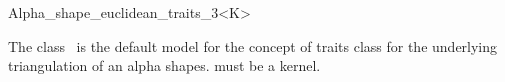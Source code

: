 \ccRefPageBegin


\begin{ccRefClass}{Alpha_shape_euclidean_traits_3<K>}  %


\ccDefinition
  
The class \ccRefName\ is the default  model for the concept
 of traits class for
the underlying triangulation of an alpha shapes.
 must be a kernel.


\ccIsModel
{}





\end{ccRefClass}

\ccRefPageEnd

